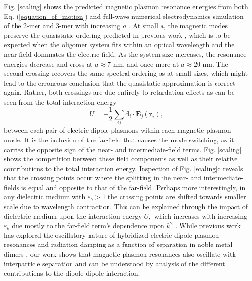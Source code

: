 \documentclass[journal=apchd5,manuscript=article]{achemso}
\begin{document}
Fig. \ref{scaling} shows the predicted magnetic plasmon resonance energies from both Eq. (\ref{equation_of_motion}) and full-wave numerical electrodynamics simulation of the 2-mer and 3-mer with increasing $a$ \cite{Hohenester2012}. At small $a$, the magnetic modes preserve the quasistatic ordering predicted in previous work \cite{Cherqui2014}, which is to be expected when the oligomer system fits within an optical wavelength and the near-field dominates the electric field. As the system size increases, the resonance energies decrease and cross at $a \approx 7$ nm, and once more at $a \approx 20$ nm. The second crossing recovers the same spectral ordering as at small sizes, which might lead to the erroneous conclusion that the quasistatic approximation is correct again. Rather, both crossings are due entirely to retardation effects as can be seen from the total interaction energy 
\begin{equation}
U = -\frac{1}{2} \sum_{ij} \textbf{d}_i \cdot \textbf{E}_j(\textbf{r}_i),
\label{interactionenergy}
\end{equation}
between each pair of electric dipole plasmons within each magnetic plasmon mode. It is the inclusion of the far-field that causes the mode switching, as it carries the opposite sign of the near- and intermediate-field terms. Fig. \ref{scaling} shows the competition between these field components as well as their relative contributions to the total interaction energy. Inspection of Fig. \ref{scaling}c reveals that the crossing points occur where the splitting in the near- and intermediate-fields is equal and opposite to that of the far-field. Perhaps more interestingly, in any dielectric medium with $\varepsilon_b > 1$ the crossing points are shifted towards smaller scale due to wavelength contraction. This can be explained through the impact of dielectric medium upon the interaction energy $U,$ which increases with increasing $\varepsilon_b$ due mostly to the far-field term's dependence upon $k^2$ \cite{Elsayed2008}. While previous work has explored the oscillatory nature of hybridized electric dipole plasmon resonances and radiation damping as a function of separation in noble metal dimers \cite{vonPlessen2007}, our work shows that magnetic plasmon resonances also oscillate with interparticle separation and can be understood by analysis of the different contributions to the dipole-dipole interaction.
\end{document}
